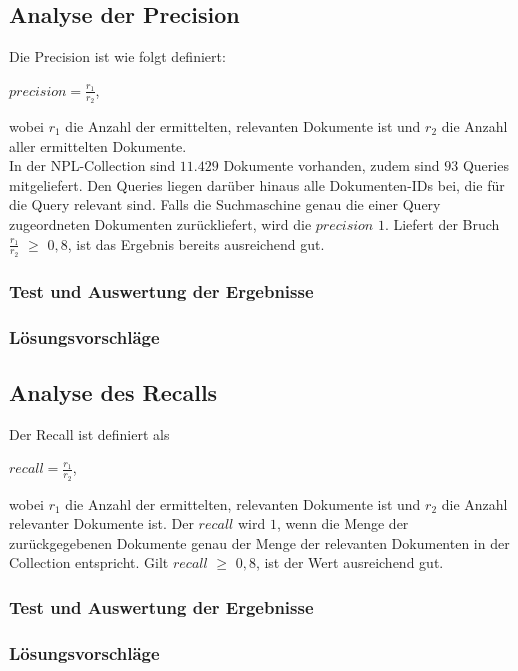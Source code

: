 \subsection{Analyse der Precision}
Die Precision ist wie folgt definiert:
\begin{center}
	$precision = \frac{r_1}{r_2}$,
\end{center}
wobei $r_1$ die Anzahl der ermittelten, relevanten Dokumente ist und $r_2$ die Anzahl aller ermittelten Dokumente.
\\
In der NPL-Collection sind $11.429$ Dokumente vorhanden, zudem sind $93$ Queries mitgeliefert. Den Queries liegen darüber hinaus alle Dokumenten-IDs bei, die für die Query relevant sind. Falls die Suchmaschine genau die einer Query zugeordneten Dokumenten zurückliefert, wird die $precision$ $1$.
Liefert der Bruch $\frac{r_1}{r_2}$ $\ge$ $0,8$, ist das Ergebnis bereits ausreichend gut.

\subsubsection{Test und Auswertung der Ergebnisse}

\subsubsection{Lösungsvorschläge}

\subsection{Analyse des Recalls}
Der Recall ist definiert als
\begin{center}
	$recall = \frac{r_1}{r_2}$, 
\end{center}
wobei $r_1$ die Anzahl der ermittelten, relevanten Dokumente ist und $r_2$ die Anzahl relevanter Dokumente ist.
Der $recall$ wird $1$, wenn die Menge der zurückgegebenen Dokumente genau der Menge der relevanten Dokumenten in der Collection entspricht.
Gilt $recall$ $\ge$ $0,8$, ist der Wert ausreichend gut.

\subsubsection{Test und Auswertung der Ergebnisse}

\subsubsection{Lösungsvorschläge}

